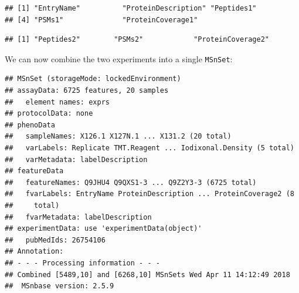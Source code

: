 \begin{knitrout}
\color{fgcolor}\begin{kframe}
\begin{alltt}
\hlstd{(hyperLOPIT2015ms3r1)[}\hlopt{:}\hlstd{]} \hlkwb{<-} \hlstd{(}\hlstd{(hyperLOPIT2015ms3r1)[}\hlopt{:}\hlstd{],} \hlstd{)}
 \hlkwb{<-}  \hlstd{,}  \hlstd{=} \hlstd{)}
 \hlkwb{<-} \hlstd{(hyperLOPIT2015ms3r1)[}\hlopt{:}\hlstd{]}
 \hlkwb{<-} \hlstd{(hyperLOPIT2015ms3r2)[}\hlopt{:}\hlstd{]}
\end{alltt}
\begin{verbatim}
## [1] "EntryName"          "ProteinDescription" "Peptides1"         
## [4] "PSMs1"              "ProteinCoverage1"
\end{verbatim}
\begin{alltt}
\end{alltt}
\begin{verbatim}
## [1] "Peptides2"        "PSMs2"            "ProteinCoverage2"
\end{verbatim}
\end{kframe}
\end{knitrout}

We can now combine the two experiments into a single \texttt{MSnSet}:

\begin{knitrout}
\color{fgcolor}\begin{kframe}
\begin{alltt}
 \hlkwb{<-} \hlopt{::}
\end{alltt}
\begin{verbatim}
## MSnSet (storageMode: lockedEnvironment)
## assayData: 6725 features, 20 samples 
##   element names: exprs 
## protocolData: none
## phenoData
##   sampleNames: X126.1 X127N.1 ... X131.2 (20 total)
##   varLabels: Replicate TMT.Reagent ... Iodixonal.Density (5 total)
##   varMetadata: labelDescription
## featureData
##   featureNames: Q9JHU4 Q9QXS1-3 ... Q9Z2Y3-3 (6725 total)
##   fvarLabels: EntryName ProteinDescription ... ProteinCoverage2 (8
##     total)
##   fvarMetadata: labelDescription
## experimentData: use 'experimentData(object)'
##   pubMedIds: 26754106 
## Annotation:  
## - - - Processing information - - -
## Combined [5489,10] and [6268,10] MSnSets Wed Apr 11 14:12:49 2018 
##  MSnbase version: 2.5.9
\end{verbatim}
\end{kframe}
\end{knitrout}

